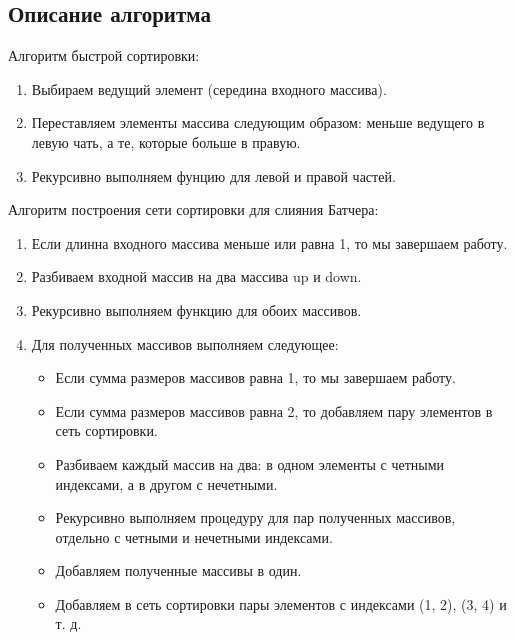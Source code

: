 \documentclass[a4paper]{report}
\begin{document}
\begin{center}
\section*{Описание алгоритма}
\end{center}
Алгоритм быстрой сортировки:
\begin{enumerate}
\item Выбираем ведущий элемент (середина входного массива).
\item Переставляем элементы массива следующим образом: меньше ведущего в левую чать, а те, которые больше в правую. 
\item Рекурсивно выполняем фунцию для левой и правой частей. 
\end{enumerate}
Алгоритм построения сети сортировки для слияния Батчера:
\begin{enumerate}
\item Если длинна входного массива меньше или равна 1, то мы завершаем работу.
\item Разбиваем входной массив на два массива up и down.
\item Рекурсивно выполняем функцию для обоих массивов.
\item Для полученных массивов выполняем следующее:
\begin{itemize}
\item Если сумма размеров массивов равна 1, то мы завершаем работу.
\item Если сумма размеров массивов равна 2, то добавляем пару элементов в сеть
сортировки.
\item Разбиваем каждый массив на два: в одном элементы с четными индексами, а в другом с нечетными.
\item Рекурсивно выполняем процедуру для пар полученных массивов, отдельно с четными и нечетными индексами.
\item Добавляем полученные массивы в один.
\item Добавляем в сеть сортировки пары элементов с индексами (1, 2), (3, 4) и т. д.
\end{itemize}
\end{enumerate}
\newpage
\end{document}

